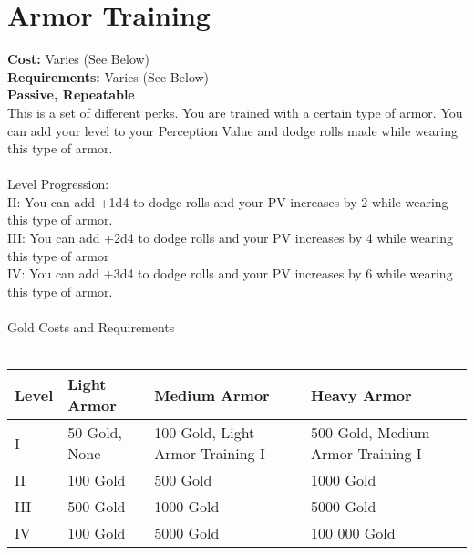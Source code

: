 \section*{Armor Training}
\textbf{Cost:} Varies (See Below)\\
\textbf{Requirements:} Varies (See Below)\\
\textbf{Passive, Repeatable}\\
This is a set of different perks. You are trained with a certain type of armor. You can add your level to your Perception Value and dodge rolls made while wearing this type of armor.\\
\\
Level Progression:\\
II: You can add +1d4 to dodge rolls and your PV increases by 2 while wearing this type of armor.\\
III: You can add +2d4 to dodge rolls and your PV increases by 4 while wearing this type of armor\\
IV: You can add +3d4 to dodge rolls and your PV increases by 6 while wearing this type of armor.\\
\\
Gold Costs and Requirements\\
\\
\begin{tabular}{l | p{3.25cm} | p{3.25cm} | p{3.25cm}}
	Level & Light Armor & Medium Armor & Heavy Armor\\ \hline
	I & 50 Gold, None & 100 Gold, Light Armor Training I & 500 Gold, Medium Armor Training I\\
	II & 100 Gold & 500 Gold & 1000 Gold\\
	III & 500 Gold & 1000 Gold & 5000 Gold\\
	IV & 100 Gold & 5000 Gold & 100 000 Gold\\
\end{tabular}